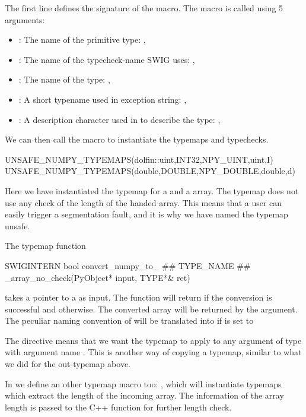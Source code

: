 The first line defines the signature of the macro. The macro is called using 5 arguments:
\begin{itemize}
\item {}: The name of the primitive type: , 
\item {}: The name of the typecheck-name SWIG uses: , 
\item {}: The name of the \numpy type: , 
\item {}: A short typename used in exception string: , 
\item {}: A description character used in \numpy to describe the type: , 
\end{itemize}
We can then call the macro to instantiate the typemaps and typechecks.
\begin{c++}
UNSAFE_NUMPY_TYPEMAPS(dolfin::uint,INT32,NPY_UINT,uint,I)
UNSAFE_NUMPY_TYPEMAPS(double,DOUBLE,NPY_DOUBLE,double,d)
\end{c++}
Here we have instantiated the typemap for a  and a  array. The typemap does not use any check of the length of the handed \numpy array. This means that a user can easily trigger a segmentation fault, and it is why we have named the typemap unsafe.\par

The typemap function
\begin{c++}
  SWIGINTERN bool convert_numpy_to_ ## TYPE_NAME ## _array_no_check(PyObject* input, TYPE*& ret)
\end{c++}
takes a pointer to a  as input. The function will return  if the conversion is successful and  otherwise. The converted array will be returned by the  argument. The peculiar naming convention of  will be translated into  if  is set to \par

The  directive means that we want the typemap to apply to any argument of type  with argument name . This is another way of copying a typemap, similar to what we did for the  out-typemap above.\par

In  we define an other typemap macro too: \-\-, which will instantiate typemaps which extract the length of the incoming \numpy array. The information of the array length is passed to the C++ function for further length check.\par

